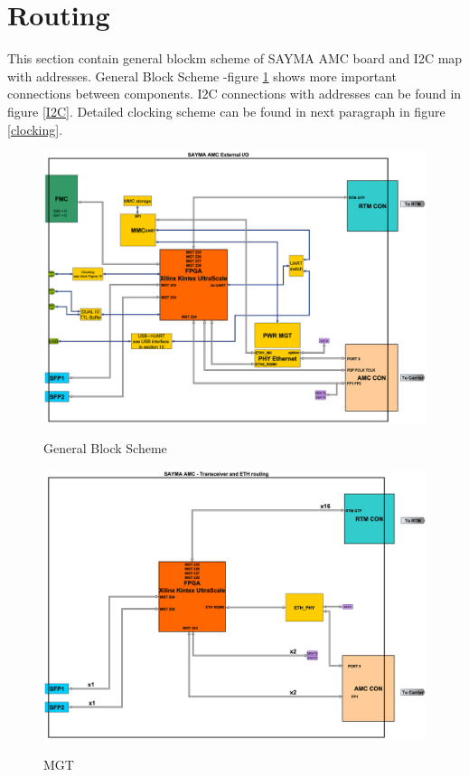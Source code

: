 \section{Routing}


This section contain general blockm scheme of SAYMA AMC board and I2C map with addresses. General Block Scheme -figure \ref{BlockScheme}
shows more important connections between components. I2C connections with addresses can be found in figure \ref{I2C}. Detailed clocking scheme can be found in next paragraph in figure \ref{clocking}.
	\begin{figure}[htbp!]
		\centering
		\includegraphics[scale=0.2]{img/sch.eps}\\
		\caption{General Block Scheme}\label{BlockScheme}
	\end{figure}

	\begin{figure}[htbp!]
		\centering
		\includegraphics[scale=0.2]{img/sch_mgt.eps}\\
		\caption{MGT} \label{MGT}
	\end{figure}
	
